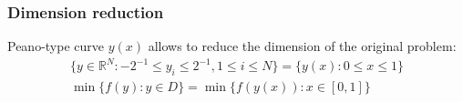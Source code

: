 \documentclass[aspectratio=1610]{beamer}
\begin{document}
\begin{frame}
  \frametitle{Dimension reduction}
  Peano-type curve \(y(x)\) allows to reduce the dimension of the original problem:
  \begin{gather}
    \lbrace y\in \mathbb{R}^N:-2^{-1}\leqslant y_i\leqslant 2^{-1},1\leqslant i\leqslant N\rbrace=\{y(x):0\leqslant x\leqslant 1\} \nonumber \\
    \min\{f(y): y\in D\}=\min\{f(y(x)): x\in [0,1]\} \nonumber
  \end{gather}

  \begin{figure}[ht]
  \end{figure}
\end{frame}

\begin{frame}
  \frametitle{}

\end{frame}
\end{document}
